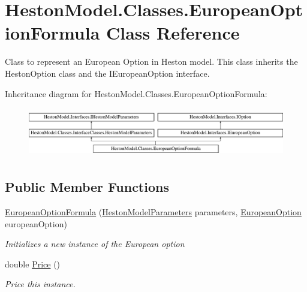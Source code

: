 \hypertarget{class_heston_model_1_1_classes_1_1_european_option_formula}{}\section{Heston\+Model.\+Classes.\+European\+Option\+Formula Class Reference}
\label{class_heston_model_1_1_classes_1_1_european_option_formula}


Class to represent an European Option in Heston model. This class inherits the Heston\+Option class and the I\+European\+Option interface.  


Inheritance diagram for Heston\+Model.\+Classes.\+European\+Option\+Formula\+:\begin{figure}[H]
\begin{center}
\leavevmode
\includegraphics[height=2.198953cm]{class_heston_model_1_1_classes_1_1_european_option_formula}
\end{center}
\end{figure}
\subsection*{Public Member Functions}
\begin{DoxyCompactItemize}
\item 
\mbox{\hyperlink{class_heston_model_1_1_classes_1_1_european_option_formula_a3350d3acf23c4c0c750c966b1b54f5b4}{European\+Option\+Formula}} (\mbox{\hyperlink{class_heston_model_1_1_classes_1_1_interface_classes_1_1_heston_model_parameters}{Heston\+Model\+Parameters}} parameters, \mbox{\hyperlink{class_heston_model_1_1_classes_1_1_interface_classes_1_1_european_option}{European\+Option}} european\+Option)
\begin{DoxyCompactList}\small\item\em Initializes a new instance of the European option \end{DoxyCompactList}\item 
double \mbox{\hyperlink{class_heston_model_1_1_classes_1_1_european_option_formula_a25389e3e8b4d89daaa0b9b6af39f948c}{Price}} ()
\begin{DoxyCompactList}\small\item\em Price this instance. \end{DoxyCompactList}\end{DoxyCompactItemize}
